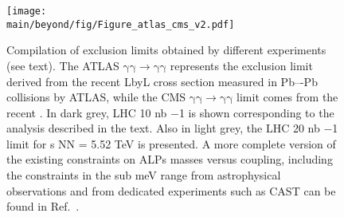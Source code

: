 \begin{figure}[!htbp]
\centering
  \texttt{[image: \\main/beyond/fig/Figure\_atlas\_cms\_v2.pdf]}
  \caption{Compilation of exclusion limits obtained by different experiments (see text). The ATLAS $\mathrm{\gamma\gamma\rightarrow\gamma\gamma}$ represents the exclusion limit derived from the recent LbyL cross section measured in Pb–-Pb collisions by ATLAS, while the CMS $\mathrm{\gamma\gamma\rightarrow\gamma\gamma}$ limit comes from the recent . In dark grey, LHC 10 nb −1 is shown corresponding to the analysis described in the text. Also in light grey, the LHC 20 nb −1 limit for s NN = 5.52 TeV is presented. A more complete version of the existing constraints on ALPs masses versus coupling, including the constraints in the sub meV range from astrophysical observations and from dedicated experiments such as CAST can be found in Ref.~\cite{Bauer:2017ris}.}
  \label{fig:alp-lambda-limits-cms}
\end{figure}



